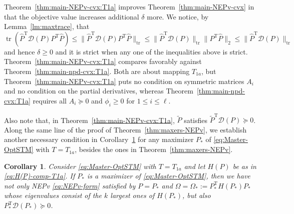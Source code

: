 \documentclass[11pt]{article}
\def\scrD{\mathscr{D}}
\def\wtd{\widetilde}
\def\what{\widehat}
\DeclareMathOperator{\tr}{tr}
\DeclareMathOperator{\T}{T}
\def\Blue{\textcolor{blue}}
\newtheorem{corollary}{Corollary}[section]
\theoremstyle{definition}
\numberwithin{equation}{section}
\begin{document}
Theorem~\ref{thm:main-NEPv-cvx:T1a} improves Theorem~\ref{thm:main-NEPv-cvx} in that
the objective value
        increases additional $\delta$ more.  We notice, by Lemma~\ref{lm:maxtrace}, that
        $$
        \tr(\what P^{\T}\scrD(P)P^{\T}\what P)
          \le\|\what P^{\T}\scrD(P)P^{\T}\what P\|_{\tr}\le\|\what P^{\T}\scrD(P)\|_{\tr}\|P^{\T}\what P\|_2
          \le\|\what P^{\T}\scrD(P)\|_{\tr}
        $$
        and hence
        $\delta\ge 0$ and it is strict when any one of the inequalities above is strict.
%
%
Theorem~\ref{thm:main-NEPv-cvx:T1a} compares favorably against Theorem~\ref{thm:main-npd-cvx:T1a}. Both are about
mapping $T_{1a}$, but Theorem~\ref{thm:main-NEPv-cvx:T1a} puts no condition on symmetric matrices $A_i$ and
no condition on the partial derivatives, whereas Theorem~\ref{thm:main-npd-cvx:T1a} requires all $A_i\succeq 0$ and
$\phi_i\ge 0$ for $1\le i\le \ell$.


Also note that, in Theorem~\ref{thm:main-NEPv-cvx:T1a}, $\wtd P$ satisfies
$\wtd P^{\T}\scrD(P)\succeq 0$. Along the same line of the proof of Theorem~\ref{thm:maxers-NEPv},
we establish another necessary condition in Corollary~\ref{cor:T1a-NEPv} for any maximizer $P_*$ of \eqref{eq:Master-OptSTM}
with $T=T_{1a}$, besides the ones in
Theorem~\ref{thm:maxers-NEPv}.

\begin{corollary}\label{cor:T1a-NEPv}
Consider \eqref{eq:Master-OptSTM} with $T=T_{1a}$ and let $H(P)$ be as in \eqref{eq:H(P)-comp-T1a}.
If $P_*$ is a  maximizer of \eqref{eq:Master-OptSTM}, then we
have not only NEPv \eqref{eq:NEPv-form} satisfied by $P=P_*$ and $\Omega=\Omega_*:=P_*^{\T}H(P_*)P_*$ whose eigenvalues
consist of the $k$ largest ones of $H(P_*)$, %
but also $P_*^{\T}\scrD(P_*)\succeq 0$.
\end{corollary}
\end{document}

